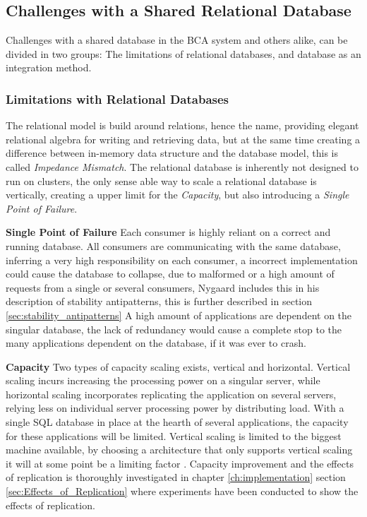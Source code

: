 
\subsection{Challenges with a Shared Relational Database}
Challenges with a shared database in the BCA system and others alike, can be divided in two groups: The limitations of relational databases, and database as an integration method.

\subsubsection{Limitations with Relational Databases}
The relational model is build around relations, hence the name, providing elegant relational algebra for writing and retrieving data, but at the same time creating a difference between in-memory data structure and the database model, this is called \textit{Impedance Mismatch}. The relational database is inherently not designed to run on clusters, the only sense able way to scale a relational database is vertically, creating a upper limit for the \textit{Capacity}, but also introducing a \textit{Single Point of Failure}. 

\textbf{Single Point of Failure}
Each consumer is highly reliant on a correct and running database. All consumers are communicating with the same database, inferring a very high responsibility on each consumer, a incorrect implementation could cause the database to collapse, due to malformed or a high amount of requests from a single or several consumers, Nygaard includes this in his description of stability antipatterns\cite[p. 31]{nygard2007release}, this is further described in section \ref{sec:stability_antipatterns}
A high amount of applications are dependent on the singular database, the lack of redundancy would cause a complete stop to the many applications dependent on the database, if it was ever to crash.

\textbf{Capacity}
Two types of capacity scaling exists, vertical and horizontal. Vertical scaling incurs increasing the processing power on a singular server, while horizontal scaling incorporates replicating the application on several servers, relying less on individual server processing power by distributing load. With a single SQL database in place at the hearth of several applications, the capacity for these applications will be limited. Vertical scaling is limited to the biggest machine available, by choosing a architecture that only supports vertical scaling it will at some point be a limiting factor \cite{meshenberg2016microservices}.
Capacity improvement and the effects of replication is thoroughly investigated in chapter \ref{ch:implementation} section \ref{sec:Effects_of_Replication} where experiments have been conducted to show the effects of replication.

